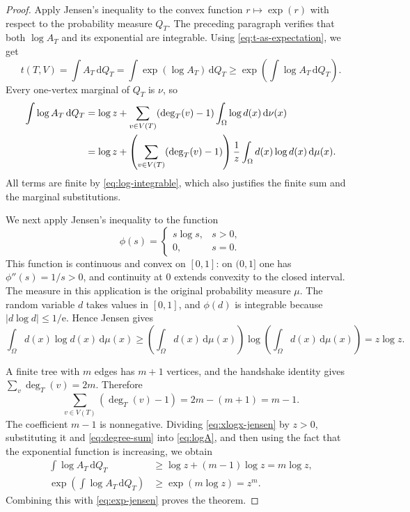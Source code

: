 \documentclass[11pt]{article}
\newcommand{\dd}{\,\mathrm{d}}
\begin{document}
\begin{proof}
Apply Jensen's inequality to the convex function
$r\mapsto\exp(r)$ with respect to the probability measure $Q_T$.
The preceding paragraph verifies that both $\log A_T$ and its
exponential are integrable.  Using \eqref{eq:t-as-expectation}, we get
\begin{equation}
t(T,V)=\int A_T\dd Q_T
=\int\exp(\log A_T)\dd Q_T
\geq\exp\left(\int\log A_T\dd Q_T\right).
\label{eq:exp-jensen}
\end{equation}
Every one-vertex marginal of $Q_T$ is $\nu$, so
\begin{align}
\int\log A_T\dd Q_T
&=\log z+
\sum_{v\in V(T)}(\deg_T(v)-1)
\int_\Omega\log d(x)\dd\nu(x)
\notag\\
&=\log z+
\left(\sum_{v\in V(T)}(\deg_T(v)-1)\right)
\frac1z\int_\Omega d(x)\log d(x)\dd\mu(x).
\label{eq:logA}
\end{align}
All terms are finite by \eqref{eq:log-integrable}, which also justifies
the finite sum and the marginal substitutions.

We next apply Jensen's inequality to the function
\[
\phi(s)=
\begin{cases}
s\log s,&s>0,\\
0,&s=0.
\end{cases}
\]
This function is continuous and convex on $[0,1]$: on $(0,1]$ one has
$\phi''(s)=1/s>0$, and continuity at $0$ extends convexity to the closed
interval.  The measure in this application is the original probability
measure $\mu$.  The random variable $d$ takes values in $[0,1]$, and
$\phi(d)$ is integrable because $|d\log d|\leq1/\mathrm{e}$.  Hence
Jensen gives
\begin{equation}
\int_\Omega d(x)\log d(x)\dd\mu(x)
\geq
\left(\int_\Omega d(x)\dd\mu(x)\right)
\log\left(\int_\Omega d(x)\dd\mu(x)\right)
=z\log z.
\label{eq:xlogx-jensen}
\end{equation}

A finite tree with $m$ edges has $m+1$ vertices, and the handshake
identity gives $\sum_v\deg_T(v)=2m$.  Therefore
\begin{equation}
\sum_{v\in V(T)}(\deg_T(v)-1)
=2m-(m+1)=m-1.
\label{eq:degree-sum}
\end{equation}
The coefficient $m-1$ is nonnegative.  Dividing
\eqref{eq:xlogx-jensen} by $z>0$, substituting it and
\eqref{eq:degree-sum} into \eqref{eq:logA}, and then using the fact that
the exponential function is increasing, we obtain
\begin{align*}
\int\log A_T\dd Q_T
&\geq\log z+(m-1)\log z=m\log z,
\\
\exp\left(\int\log A_T\dd Q_T\right)
&\geq\exp(m\log z)=z^m.
\end{align*}
Combining this with \eqref{eq:exp-jensen} proves the theorem.
\end{proof}
\end{document}
